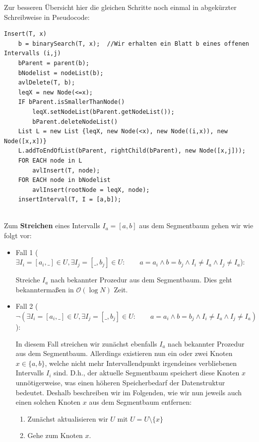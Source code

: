 \documentclass[a4paper]{article}
\begin{document}
\begin{itemize}
\begin{itemize}
\begin{enumerate}
     \end{enumerate}
\end{itemize}

Zur besseren Übersicht hier die gleichen Schritte noch einmal in abgekürzter Schreibweise in
Pseudocode:

\begin{lstlisting}
Insert(T, x)
	b = binarySearch(T, x);  //Wir erhalten ein Blatt b eines offenen Intervalls (i,j)
	bParent = parent(b);
	bNodelist = nodeList(b);
	avlDelete(T, b);
	leqX = new Node(<=x);
	IF bParent.isSmallerThanNode()
		leqX.setNodeList(bParent.getNodeList());
		bParent.deleteNodeList()
	List L = new List {leqX, new Node(<x), new Node((i,x)), new Node([x,x])}
	L.addToEndOfList(bParent, rightChild(bParent), new Node([x,j]));
	FOR EACH node in L
		avlInsert(T, node);
	FOR EACH node in bNodelist
		avlInsert(rootNode = leqX, node);
	insertInterval(T, I = [a,b]);
	
\end{lstlisting}

Zum \textbf{Streichen} eines Intervalls $I_a = [a,b]$ aus dem Segmentbaum gehen wir wie folgt vor:

\begin{itemize}
	\item Fall 1 ($\exists I_i = [a_i, \_] \in U, \exists I_j = [\_, b_j] \in U: \qquad a = a_i \wedge b = b_j \wedge I_i \neq I_a \wedge I_j \neq I_a $):
	
	Streiche $I_a$ nach bekannter Prozedur aus dem Segmentbaum. Dies geht bekanntermaßen in 
	$\mathcal{O}(\log N)$ Zeit. 
	\item Fall 2 ($\neg(\exists I_i = [a_i, \_] \in U, \exists I_j = [\_, b_j] \in U: \qquad a = a_i \wedge b = b_j \wedge I_i \neq I_a \wedge I_j \neq I_a )$):
	
	In diesem Fall streichen wir zunächst ebenfalls $I_a$ nach bekannter Prozedur aus dem Segmentbaum.
	Allerdings existieren nun ein oder zwei Knoten $x \in \{a,b\}$, welche nicht mehr Intervallendpunkt
	irgendeines verbliebenen Intervalls $I_i$ sind. D.h., der aktuelle Segmentbaum speichert diese
	Knoten $x$ unnötigerweise, was einen höheren Speicherbedarf der Datenstruktur bedeutet.
	Deshalb beschreiben wir im Folgenden, wie wir nun jeweils auch einen solchen Knoten $x$ aus dem Segmentbaum
	entfernen:
	
	\begin{enumerate}
		\item Zunächst aktualisieren wir $U$ mit $U = U\setminus \{x\}$
		\item Gehe zum Knoten $x$.
	\end{enumerate}
\end{itemize}

\end{itemize}
\end{document}

